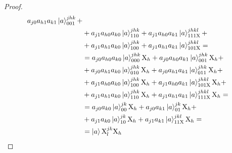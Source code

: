 \begin{proof}
\begin{align*}
    a_{j0}a_{h1}a_{k1}\ket{a}^{jhk}_{001}+                                         \\
     & +a_{j1}a_{h0}a_{k0}\ket{a}^{jhk}_{110} +
    a_{j1}a_{h0}a_{k1}\ket{a}^{jhkl}_{111\text{X}}+                                \\
     & +a_{j1}a_{h1}a_{k0}\ket{a}^{jhk}_{100} +
    a_{j1}a_{h1}a_{k1}\ket{a}^{jhkl}_{101\text{X}}=                                \\
     & =a_{j0}a_{h0}a_{k0}\ket{a}^{jhk}_{000}\text{X}_h +
    a_{j0}a_{h0}a_{k1}\ket{a}^{jhk}_{001}\text{X}_h +                              \\
     & +a_{j0}a_{h1}a_{k0}\ket{a}^{jhk}_{010}\text{X}_h +
    a_{j0}a_{h1}a_{k1}\ket{a}^{jhk}_{011}\text{X}_h +                              \\
     & +a_{j1}a_{h0}a_{k0}\ket{a}^{jhk}_{100}\text{X}_h +
    a_{j1}a_{h0}a_{k1}\ket{a}^{jhkl}_{101\text{X}}\text{X}_h +                     \\
     & + a_{j1}a_{h1}a_{k0}\ket{a}^{jhk}_{110}\text{X}_h +
    a_{j1}a_{h1}a_{k1}\ket{a}^{jhkl}_{111\text{X}}\text{X}_h =                     \\
     & =a_{j0}a_{k0}\ket{a}^{jk}_{00}\text{X}_h+
    a_{j0}a_{k1}\ket{a}^{jk}_{01}\text{X}_h+                                            \\
     & +a_{j1}a_{k0}\ket{a}^{jk}_{10}\text{X}_h+
    a_{j1}a_{k1}\ket{a}^{jkl}_{11\text{X}}\text{X}_h=                                   \\
     & =\ket{a}\text{X}^{jk}_{l}\text{X}_h
  \end{align*}
\end{proof}
